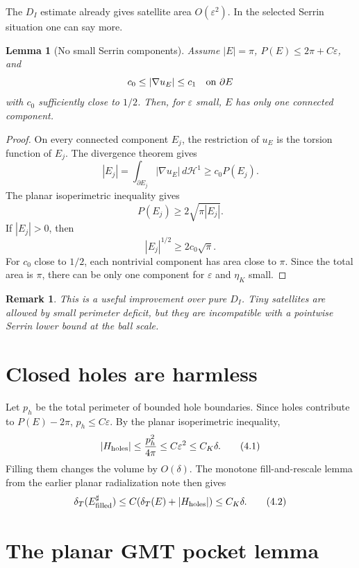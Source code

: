 \documentclass[11pt]{article}
\newtheorem{lemma}[theorem]{Lemma}
\newtheorem{remark}[theorem]{Remark}
\newcommand{\dT}{\delta_T}
\begin{document}
The \(D_I\) estimate already gives satellite area \(O(\varepsilon^2)\).
In the selected Serrin situation one can say more.

\begin{lemma}[No small Serrin components]\label{lem:no-small-components}
Assume \(|E|=\pi\), \(P(E)\le2\pi+C\varepsilon\), and
\[
   c_0\le |\nabla u_E|\le c_1
   \quad\hbox{on }\partial E
\]
with \(c_0\) sufficiently close to \(1/2\).  Then, for \(\varepsilon\) small,
\(E\) has only one connected component.
\end{lemma}

\begin{proof}
On every connected component \(E_j\), the restriction of \(u_E\) is the
torsion function of \(E_j\).  The divergence theorem gives
\[
   |E_j|=\int_{\partial E_j}|\nabla u_E|\,d\mathcal H^1
      \ge c_0 P(E_j).
   \tag{3.1}
\]
The planar isoperimetric inequality gives
\[
   P(E_j)\ge 2\sqrt{\pi |E_j|}.
\]
If \(|E_j|>0\), then
\[
   |E_j|^{1/2}\ge 2c_0\sqrt\pi .
\]
For \(c_0\) close to \(1/2\), each nontrivial component has area close to
\(\pi\).  Since the total area is \(\pi\), there can be only one component
for \(\varepsilon\) and \(\eta_K\) small.
\end{proof}

\begin{remark}
This is a useful improvement over pure \(D_I\).  Tiny satellites are allowed
by small perimeter deficit, but they are incompatible with a pointwise Serrin
lower bound at the ball scale.
\end{remark}

\section{Closed holes are harmless}

Let \(p_h\) be the total perimeter of bounded hole boundaries.  Since holes
contribute to \(P(E)-2\pi\), \(p_h\le C\varepsilon\).  By the planar
isoperimetric inequality,
\[
   |H_{\rm holes}|
      \le \frac{p_h^2}{4\pi}
      \le C\varepsilon^2
      \le C_K\delta .
   \tag{4.1}\label{eq:holes-area}
\]
Filling them changes the volume by \(O(\delta)\).  The monotone
fill-and-rescale lemma from the earlier planar radialization note then gives
\[
   \dT(E_{\rm filled}^{\sharp})
      \le C(\dT(E)+|H_{\rm holes}|)
      \le C_K\delta .
   \tag{4.2}\label{eq:holes-fill}
\]

\section{The planar GMT pocket lemma}
\end{document}
